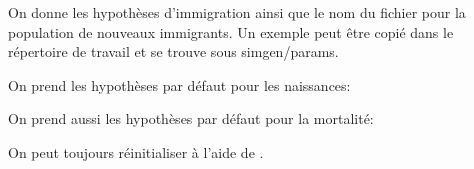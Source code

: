 \documentclass[letterpaper,10pt,french]{sphinxmanual}
\begin{document}
\begin{sphinxVerbatim}[commandchars=\\\{\}]
\end{sphinxVerbatim}

On donne les hypothèses d’immigration ainsi que le nom du fichier pour la population de nouveaux immigrants. Un exemple peut être copié dans le répertoire de travail et se trouve sous simgen/params.

\begin{sphinxVerbatim}[commandchars=\\\{\}]
\end{sphinxVerbatim}

On prend les hypothèses par défaut pour les naissances:

\begin{sphinxVerbatim}[commandchars=\\\{\}]
\end{sphinxVerbatim}

On prend aussi les hypothèses par défaut pour la mortalité:

\begin{sphinxVerbatim}[commandchars=\\\{\}]
\end{sphinxVerbatim}

On peut toujours réinitialiser à l’aide de .

\begin{sphinxVerbatim}[commandchars=\\\{\}]
\end{sphinxVerbatim}

\begin{sphinxVerbatim}[commandchars=\\\{\}]
\end{sphinxVerbatim}

\begin{sphinxVerbatim}[commandchars=\\\{\}]
\end{sphinxVerbatim}
\end{document}
